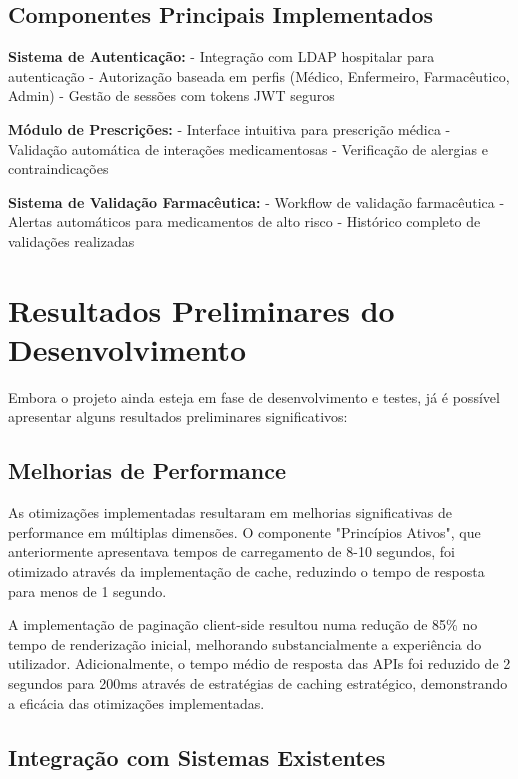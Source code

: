\subsection{Componentes Principais Implementados}

\textbf{Sistema de Autenticação:}
- Integração com LDAP hospitalar para autenticação
- Autorização baseada em perfis (Médico, Enfermeiro, Farmacêutico, Admin)
- Gestão de sessões com tokens JWT seguros

\textbf{Módulo de Prescrições:}
- Interface intuitiva para prescrição médica
- Validação automática de interações medicamentosas
- Verificação de alergias e contraindicações

\textbf{Sistema de Validação Farmacêutica:}
- Workflow de validação farmacêutica
- Alertas automáticos para medicamentos de alto risco
- Histórico completo de validações realizadas

\section{Resultados Preliminares do Desenvolvimento}

Embora o projeto ainda esteja em fase de desenvolvimento e testes, já é possível apresentar alguns resultados preliminares significativos:

\subsection{Melhorias de Performance}

As otimizações implementadas resultaram em melhorias significativas de performance em múltiplas dimensões. O componente "Princípios Ativos", que anteriormente apresentava tempos de carregamento de 8-10 segundos, foi otimizado através da implementação de cache, reduzindo o tempo de resposta para menos de 1 segundo. 

A implementação de paginação client-side resultou numa redução de 85\% no tempo de renderização inicial, melhorando substancialmente a experiência do utilizador. Adicionalmente, o tempo médio de resposta das APIs foi reduzido de 2 segundos para 200ms através de estratégias de caching estratégico, demonstrando a eficácia das otimizações implementadas.

\subsection{Integração com Sistemas Existentes}

